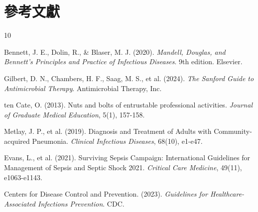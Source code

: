 \documentclass[12pt,a4paper]{article}
\begin{document}
\section{參考文獻}
\begin{thebibliography}{10}

Bennett, J. E., Dolin, R., \& Blaser, M. J. (2020). \textit{Mandell, Douglas, and Bennett's Principles and Practice of Infectious Diseases}. 9th edition. Elsevier.

Gilbert, D. N., Chambers, H. F., Saag, M. S., et al. (2024). \textit{The Sanford Guide to Antimicrobial Therapy}. Antimicrobial Therapy, Inc.

ten Cate, O. (2013). Nuts and bolts of entrustable professional activities. \textit{Journal of Graduate Medical Education}, 5(1), 157-158.

Metlay, J. P., et al. (2019). Diagnosis and Treatment of Adults with Community-acquired Pneumonia. \textit{Clinical Infectious Diseases}, 68(10), e1-e47.

Evans, L., et al. (2021). Surviving Sepsis Campaign: International Guidelines for Management of Sepsis and Septic Shock 2021. \textit{Critical Care Medicine}, 49(11), e1063-e1143.

Centers for Disease Control and Prevention. (2023). \textit{Guidelines for Healthcare-Associated Infections Prevention}. CDC.

\end{thebibliography}
\end{document}
